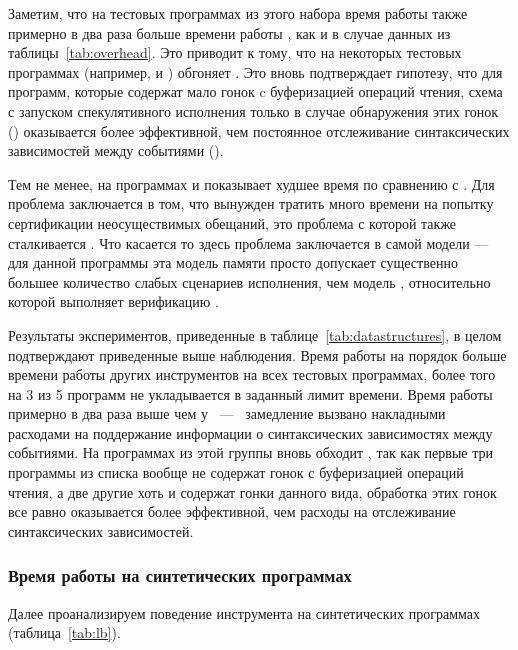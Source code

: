 Заметим, что на тестовых программах из этого набора 
время работы \hmc также примерно в два раза больше времени работы \genmc, 
как и в случае данных из таблицы~\ref{tab:overhead}.
Это приводит к тому, что на некоторых тестовых программах 
(например,  и ) \wmc обгоняет \hmc.
Это вновь подтверждает гипотезу, что для программ, 
которые содержат мало гонок c буферизацией операций чтения, 
схема с запуском спекулятивного исполнения только в случае 
обнаружения этих гонок (\wmc) оказывается более эффективной, 
чем постоянное отслеживание синтаксических зависимостей между событиями (\hmc). 

Тем не менее, на программах  и 
\wmc показывает худшее время по сравнению с \hmc.
Для  проблема заключается в том, 
что \wmc вынужден тратить много времени 
на попытку сертификации неосуществимых обещаний, 
это проблема с которой также сталкивается \CDSChecker.
Что касается  то здесь проблема 
заключается в самой модели \WkmS --- для 
данной программы эта модель памяти просто допускает 
существенно большее количество слабых сценариев исполнения, 
чем модель \IMM, относительно которой выполняет верификацию \hmc. 

Результаты экспериментов, приведенные в таблице~\ref{tab:datastructures},
в целом подтверждают приведенные выше наблюдения. 
Время работы \CDSChecker на порядок больше времени 
работы других инструментов на всех тестовых программах, 
более того на 3 из 5 программ \CDSChecker не укладывается 
в заданный лимит времени. Время работы \hmc примерно в
два раза выше чем у \genmc~---~ замедление вызвано накладными расходами
на поддержание информации о синтаксических зависимостях между событиями.
На программах из этой группы \wmc вновь обходит \hmc, 
так как первые три программы из списка вообще не содержат 
гонок с буферизацией операций чтения, 
а две другие хоть и содержат гонки данного вида, 
обработка этих гонок все равно оказывается 
более эффективной, чем расходы на отслеживание синтаксических зависимостей.

\subsubsection*{Время работы \wmc на синтетических программах}

Далее проанализируем поведение инструмента \genmc
на синтетических программах (таблица~\ref{tab:lb}).

